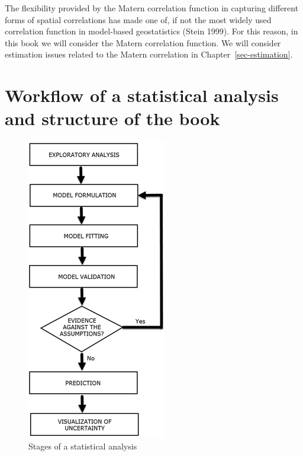 \documentclass[
  letterpaper,
]{krantz}
\begin{document}
The flexibility provided by the Matern correlation function in capturing
different forms of spatial correlations has made one of, if not the most
widely used correlation function in model-based geostatistics (Stein
1999). For this reason, in this book we will consider the Matern
correlation function. We will consider estimation issues related to the
Matern correlation in Chapter~\ref{sec-estimation}.

\hypertarget{workflow-of-a-statistical-analysis-and-structure-of-the-book}{%
\section{Workflow of a statistical analysis and structure of the
book}\label{workflow-of-a-statistical-analysis-and-structure-of-the-book}}

\begin{figure}

{\centering \includegraphics{./figures/workflow_diagram.png}

}

\caption{\label{fig-stages}Stages of a statistical analysis}

\end{figure}
\end{document}
